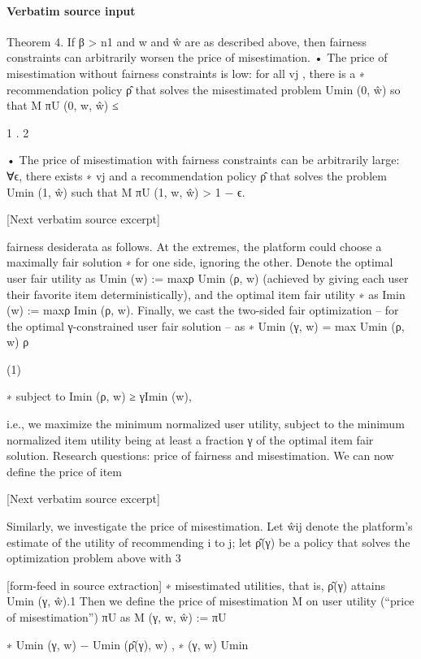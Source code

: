 \documentclass[10pt]{article}
\begin{document}
\paragraph{Verbatim source input}
\begin{ReviewVerbatim}
Theorem 4. If β > n1 and w and ŵ are as described above, then fairness constraints can arbitrarily
worsen the price of misestimation.
• The price of misestimation without fairness constraints is low: for all {vj }, there is a
∗
recommendation policy ρ̂ that solves the misestimated problem Umin
(0, ŵ) so that
M
πU
(0, w, ŵ) ≤

1
.
2

• The price of misestimation with fairness constraints can be arbitrarily large: ∀ϵ, there exists
∗
{vj } and a recommendation policy ρ̂ that solves the problem Umin
(1, ŵ) such that
M
πU
(1, w, ŵ) > 1 − ϵ.

[Next verbatim source excerpt]

fairness desiderata as follows. At the extremes, the platform could choose a maximally fair solution
∗
for one side, ignoring the other. Denote the optimal user fair utility as Umin
(w) := maxρ Umin (ρ, w)
(achieved by giving each user their favorite item deterministically), and the optimal item fair utility
∗
as Imin
(w) := maxρ Imin (ρ, w).
Finally, we cast the two-sided fair optimization – for the optimal γ-constrained user fair solution – as
∗
Umin
(γ, w) = max Umin (ρ, w)
ρ

(1)

∗
subject to Imin (ρ, w) ≥ γImin
(w),

i.e., we maximize the minimum normalized user utility, subject to the minimum normalized item
utility being at least a fraction γ of the optimal item fair solution.
Research questions: price of fairness and misestimation. We can now define the price of item

[Next verbatim source excerpt]

Similarly, we investigate the price of misestimation. Let ŵij denote the platform’s estimate of the
utility of recommending i to j; let ρ̂(γ) be a policy that solves the optimization problem above with
3


[form-feed in source extraction]
∗
misestimated utilities, that is, ρ̂(γ) attains Umin
(γ, ŵ).1 Then we define the price of misestimation
M
on user utility (“price of misestimation”) πU as
M
(γ, w, ŵ) :=
πU

∗
Umin
(γ, w) − Umin (ρ̂(γ), w)
,
∗ (γ, w)
Umin


\end{ReviewVerbatim}
\end{document}

